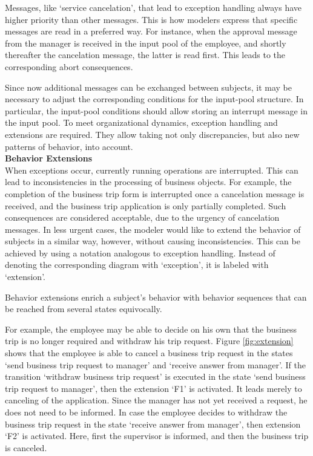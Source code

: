 Messages, like ‘service cancelation’, that lead to exception handling always have higher priority than other messages. This is how modelers express that specific messages are read in a preferred way. For instance, when the approval message from the manager is received in the input pool of the employee, and shortly thereafter the cancelation message, the latter is read first. This leads to the corresponding abort consequences.

Since now additional messages can be exchanged between subjects, it may be necessary to adjust the corresponding conditions for the input-pool structure. In particular, the input-pool conditions should allow storing an interrupt message in the input pool.
To meet organizational dynamics, exception handling and extensions are required. They allow taking not only discrepancies, but also new patterns of behavior, into account.\\

\textbf{Behavior Extensions}\\
When exceptions occur, currently running operations are interrupted. This can lead to inconsistencies in the processing of business objects. For example, the completion of the business trip form is interrupted once a cancelation message is received, and the business trip application is only partially completed. Such consequences are considered acceptable, due to the urgency of cancelation messages. In less urgent cases, the modeler would like to extend the behavior of subjects in a similar way, however, without causing inconsistencies. This can be achieved by using a notation analogous to exception handling. Instead of denoting the corresponding diagram with ‘exception’, it is labeled with ‘extension’.

Behavior extensions enrich a subject’s behavior with behavior sequences that can be reached from several states equivocally.

For example, the employee may be able to decide on his own that the business trip is no longer required and withdraw his trip request. Figure \ref{fig:extension} shows that the employee is able to cancel a business trip request in the states ‘send business trip request to manager’ and ‘receive answer from manager’. If the transition ‘withdraw business trip request’ is executed in the state ‘send business trip request to manager’, then the extension ‘F1’ is activated. It leads merely to canceling of the application. Since the manager has not yet received a request, he does not need to be informed.
\newpage
In case the employee decides to withdraw the business trip request in the state ‘receive answer from manager’, then extension ‘F2’ is activated. Here, first the supervisor is informed, and then the business trip is canceled.


